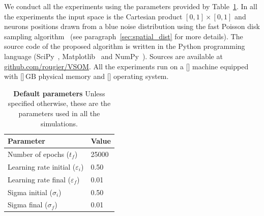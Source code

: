 We conduct all the experiments using the parameters provided by
Table~\ref{table:parameters}. In all the experiments the input space is
the Cartesian product $[0, 1] \times [0, 1]$ and neurons positions drawn from
a blue noise distribution using the fast Poisson disk sampling
algorithm~\citep{Bridson:2007} (see paragraph~\ref{sec:spatial_dist} for more details). 
The source code of the proposed algorithm is written in the Python programming
language (SciPy~\citep{Jones:2001}, Matplotlib~\citep{Hunter:2007}
and NumPy~\citep{Walt:2011}). Sources are available at 
\href{https://github.com/rougier/VSOM}{github.com/rougier/VSOM}.
All the experiments run on a [] machine equipped with []$\,\mathrm{GB}$ physical
memory and [] operating system. 
\begin{table}[!ht]
  \begin{center}
    \begin{tabular}{ll}
        \textbf{Parameter} & \textbf{Value} \\
        \hline
        Number of epochs      ($t_f$)           & 25000\\
        Learning rate initial ($\varepsilon_i$) & 0.50\\
        Learning rate final   ($\varepsilon_f$) & 0.01\\
        Sigma initial         ($\sigma_i$)      & 0.50\\
        Sigma final           ($\sigma_f$)      & 0.01\\
    \end{tabular}
      \caption{\textbf{Default parameters} Unless specified otherwise, these are
        the parameters used in all the simulations.}
      \label{table:parameters}
  \end{center}
\end{table}



